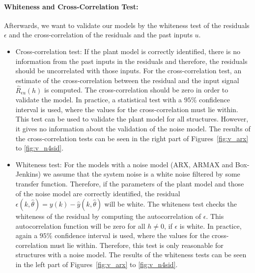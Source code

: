 \paragraph{Whiteness and Cross-Correlation Test: }
Afterwards, we want to validate our models by the whiteness test of the residuals $\epsilon$ and the cross-correlation of the residuals and the past inputs $u$.
\begin{itemize}
	\item Cross-correlation test: If the plant model is correctly identified, there is no information from the past inputs in the residuals and therefore, the residuals should be uncorrelated with those inputs. 
	For the cross-correlation test, an estimate of the cross-correlation between the residual and the input signal $\hat{R}_{\epsilon u}(h)$ is computed. The cross-correlation should be zero in order to validate the model. In practice, a statistical test with a $95\%$ confidence interval is used, where the values for the cross-correlation must lie within. This test can be used to validate the plant model for all structures. However, it gives no information about the validation of the noise model. 
	The results of the cross-correlation tests can be seen in the right part of Figures~\ref{fig:v_arx} to \ref{fig:v_n4sid}. 
	\item Whiteness test: For the models with a noise model (ARX, ARMAX and Box-Jenkins) we assume that the system noise is a white noise filtered by some transfer function. Therefore, if the parameters of the plant model and those of the noise model are correctly identified, the residual $\epsilon (k, \hat{\theta}) = y(k) - \hat{y}(k, \hat{\theta})$ will be white.
	The whiteness test checks the whiteness of the residual by computing the autocorrelation of $\epsilon$. This autocorrelation function will be zero for all $h \neq 0$, if $\epsilon$ is white. In practice, again a $95\%$ confidence interval is used, where the values for the cross-correlation must lie within.
	Therefore, this test is only reasonable for structures with a noise model.
	The results of the whiteness tests can be seen in the left part of Figures~\ref{fig:v_arx} to \ref{fig:v_n4sid}. 
\end{itemize}

